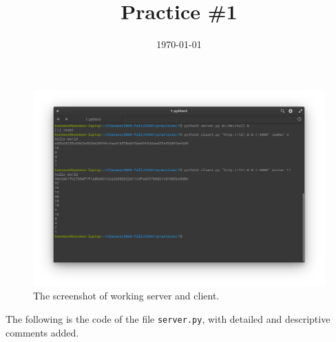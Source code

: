 \documentclass{homework}
\title{Practice \#1}
\date{\today}
\begin{document}
\maketitle

\begin{figure}[H]
  \centering
  \vspace*{-2em}
  \hspace*{-0.2\textwidth}\includegraphics[width=1.4\textwidth]{screenshot}
  \vspace*{-4em}
  \caption{The screenshot of working server and client.}
\end{figure}
\vspace*{2em}

The following is the code of the file \texttt{server.py}, with detailed and descriptive comments added.
\end{document}
